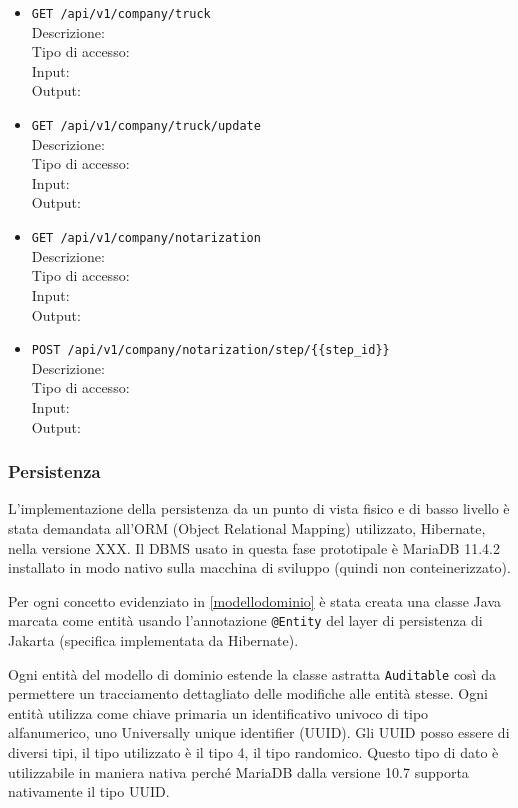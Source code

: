 \documentclass[a4paper,11pt]{article}
\begin{document}
\begin{itemize}
  \item \texttt{GET /api/v1/company/truck}
    \\ Descrizione:
    \\ Tipo di accesso:
    \\ Input:
    \\ Output:

  \item \texttt{GET /api/v1/company/truck/update}
    \\ Descrizione:
    \\ Tipo di accesso:
    \\ Input:
    \\ Output:

  \item \texttt{GET /api/v1/company/notarization}
    \\ Descrizione:
    \\ Tipo di accesso:
    \\ Input:
    \\ Output:

  \item \texttt{POST /api/v1/company/notarization/step/\{\{step\_id\}\}}
    \\ Descrizione:
    \\ Tipo di accesso:
    \\ Input:
    \\ Output:

\end{itemize}

\subsubsection{Persistenza}

L'implementazione della persistenza da un punto di vista fisico e di basso livello è stata demandata all'ORM (Object Relational Mapping) utilizzato, Hibernate, nella versione XXX. Il DBMS usato in questa fase prototipale è MariaDB 11.4.2 installato in modo nativo sulla macchina di sviluppo (quindi non conteinerizzato).

Per ogni concetto evidenziato in \ref{modellodominio} è stata creata una classe Java marcata come entità usando l'annotazione \texttt{@Entity} del layer di persistenza di Jakarta (specifica implementata da Hibernate).

Ogni entità del modello di dominio estende la classe astratta \texttt{Auditable} così da permettere un tracciamento dettagliato delle modifiche alle entità stesse.
Ogni entità utilizza come chiave primaria un identificativo univoco di tipo alfanumerico, uno Universally unique identifier (UUID). Gli UUID posso essere di diversi tipi, il tipo utilizzato è il tipo 4, il tipo randomico. Questo tipo di dato è utilizzabile in maniera nativa perché MariaDB dalla versione 10.7 \cite{mariadbUUIDData} supporta nativamente il tipo UUID.
\end{document}
